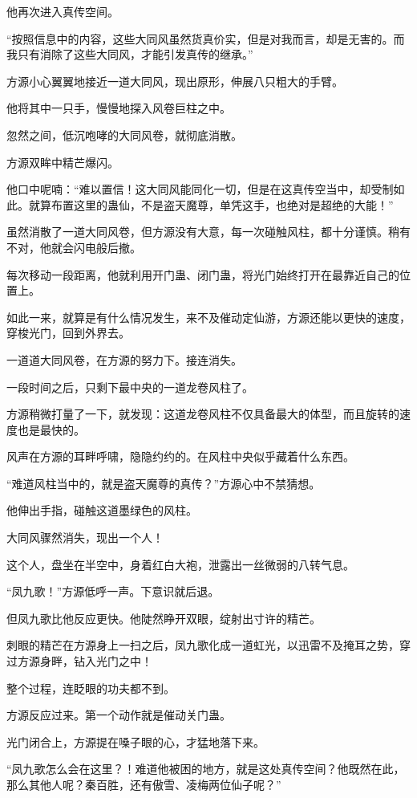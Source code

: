 \begin{this_body}
他再次进入真传空间。

“按照信息中的内容，这些大同风虽然货真价实，但是对我而言，却是无害的。而我只有消除了这些大同风，才能引发真传的继承。”

方源小心翼翼地接近一道大同风，现出原形，伸展八只粗大的手臂。

他将其中一只手，慢慢地探入风卷巨柱之中。

忽然之间，低沉咆哮的大同风卷，就彻底消散。

方源双眸中精芒爆闪。

他口中呢喃：“难以置信！这大同风能同化一切，但是在这真传空当中，却受制如此。就算布置这里的蛊仙，不是盗天魔尊，单凭这手，也绝对是超绝的大能！”

虽然消散了一道大同风卷，但方源没有大意，每一次碰触风柱，都十分谨慎。稍有不对，他就会闪电般后撤。

每次移动一段距离，他就利用开门蛊、闭门蛊，将光门始终打开在最靠近自己的位置上。

如此一来，就算是有什么情况发生，来不及催动定仙游，方源还能以更快的速度，穿梭光门，回到外界去。

一道道大同风卷，在方源的努力下。接连消失。

一段时间之后，只剩下最中央的一道龙卷风柱了。

方源稍微打量了一下，就发现：这道龙卷风柱不仅具备最大的体型，而且旋转的速度也是最快的。

风声在方源的耳畔呼啸，隐隐约约的。在风柱中央似乎藏着什么东西。

“难道风柱当中的，就是盗天魔尊的真传？”方源心中不禁猜想。

他伸出手指，碰触这道墨绿色的风柱。

大同风骤然消失，现出一个人！

这个人，盘坐在半空中，身着红白大袍，泄露出一丝微弱的八转气息。

“凤九歌！”方源低呼一声。下意识就后退。

但凤九歌比他反应更快。他陡然睁开双眼，绽射出寸许的精芒。

刺眼的精芒在方源身上一扫之后，凤九歌化成一道虹光，以迅雷不及掩耳之势，穿过方源身畔，钻入光门之中！

整个过程，连眨眼的功夫都不到。

方源反应过来。第一个动作就是催动关门蛊。

光门闭合上，方源提在嗓子眼的心，才猛地落下来。

“凤九歌怎么会在这里？！难道他被困的地方，就是这处真传空间？他既然在此，那么其他人呢？秦百胜，还有傲雪、凌梅两位仙子呢？”


\end{this_body}

